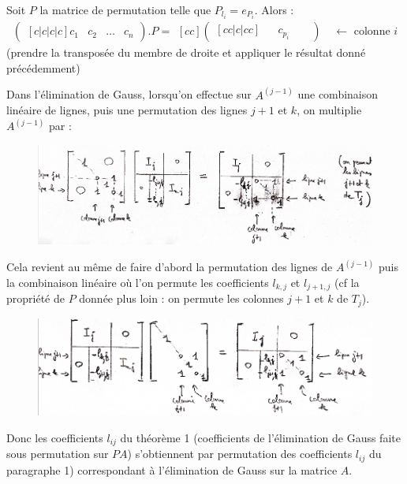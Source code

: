 \documentclass[a4paper,11pt]{article}
\theoremstyle{plain} %
\begin{document}
\begin{remark}
    Soit $P$ la matrice de permutation telle que $P_{l_{i}} = e_{P_i}$.
    Alors :
    \[
        \begin{pmatrix}[c|c|c|c]
            c_1 & c_2 & \dots & c_n
        \end{pmatrix}
        .
        P
        =
        \begin{matrix}[cc]
        \begin{pmatrix}[cc|c|cc]
            & & c_{p_i} & & 
        \end{pmatrix}
        \end{matrix}
        \text{ $\leftarrow$ colonne $i$}
    \]
(prendre la transposée du membre de droite et appliquer le résultat donné précédemment)

Dans l'élimination de Gauss, lorsqu'on effectue sur $A^{(j-1)}$ une combinaison linéaire de lignes, puis une permutation des lignes $j+1$ et $k$, on multiplie $A^{(j-1)}$ par :
\begin{figure}[h]
    \centering
    \includegraphics[scale=0.33]{matrices1.png}
\end{figure}

Cela revient au même de faire d'abord la permutation des lignes de $A^{(j-1)}$ puis la
combinaison linéaire où l'on permute les coefficients $l_{k,j}$ et $l_{j+1,j}$ (cf la
propriété de $P$ donnée plus loin : on permute les colonnes $j+1$ et $k$ de $T_j$).
\begin{figure}[h]
    \centering
    \includegraphics[scale=0.45]{matrices2.png}
\end{figure}

Donc les coefficients $l_{ij}$ du théorème 1 (coefficients de l'élimination de Gauss faite
sous permutation sur $PA$) s'obtiennent par permutation des coefficients $l_{ij}$ du
paragraphe 1) correspondant à l'élimination de Gauss sur la matrice $A$.
\end{remark}
\end{document}
